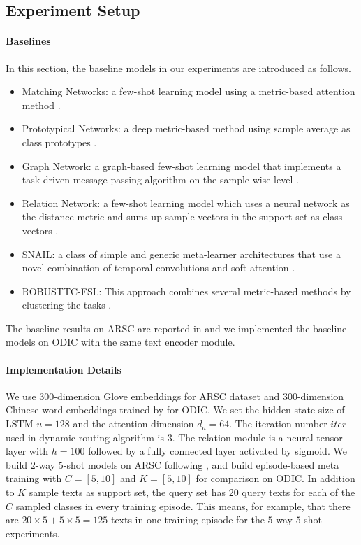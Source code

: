 \documentclass[11pt,a4paper]{article}
\begin{document}
\subsection{Experiment Setup}
\paragraph{Baselines} In this section, the baseline models in our experiments are introduced as follows.
\begin{itemize}
\item Matching Networks: a few-shot learning model using a metric-based attention method \citep{vinyals2016matching}. 
\item Prototypical Networks: a deep metric-based method using sample average as class prototypes \citep{snell2017prototypical}.
\item Graph Network: a graph-based few-shot learning model that implements a task-driven message passing algorithm on the sample-wise level \citep{Garcia2017FewShotLW}.
\item Relation Network: a few-shot learning model which uses a neural network as the distance metric and sums up sample vectors in the support set as class vectors \citep{sung2018learning}.
\item SNAIL: a class of simple and generic meta-learner architectures that use a novel combination of temporal convolutions and soft attention \citep{mishra2017simple}.
\item ROBUSTTC-FSL: This approach combines several metric-based methods by clustering the tasks \citep{yu2018diverse}.
\end{itemize}

The baseline results on ARSC are reported in \citet{yu2018diverse} and we implemented the baseline models on ODIC with the same text encoder module.


\paragraph{Implementation Details} We use 300-dimension Glove embeddings \citep{pennington2014glove} for ARSC dataset and 300-dimension Chinese word embeddings trained by \citet{li2018analogical} for ODIC. We set the hidden state size of LSTM $u=128$ and the attention dimension $d_a=64$. The iteration number $iter$ used in dynamic routing algorithm is $3$. The relation module is a neural tensor layer with $ h=100 $ followed by a fully connected layer activated by sigmoid. We build $2$-way $5$-shot models on ARSC following \citet{yu2018diverse}, and build episode-based meta training with $ C=[5, 10]$ and $ K=[5, 10]$ for comparison on ODIC. In addition to $K$ sample texts as support set, the query set has 20 query texts for each of the $C$ sampled classes in every training episode. This means, for example, that there are $20\times5 + 5 \times 5 = 125$ texts in one training episode for the $5$-way $5$-shot experiments.
\end{document}
